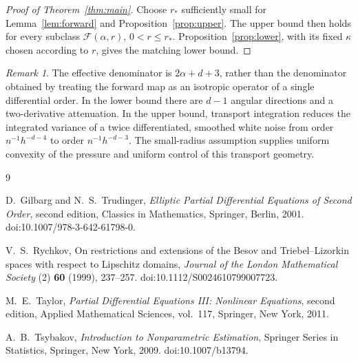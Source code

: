 \documentclass[11pt]{article}
\theoremstyle{remark}
\newtheorem{remark}[theorem]{Remark}
\newcommand{\cF}{\mathcal F}
\begin{document}
\begin{proof}[Proof of Theorem~\ref{thm:main}]
Choose \(r_*\) sufficiently small for
Lemma~\ref{lem:forward} and Proposition~\ref{prop:upper}.
The upper bound then holds for every subclass
\(\cF(\alpha,r)\), \(0<r\leq r_*\).
Proposition~\ref{prop:lower}, with its fixed \(\kappa\) chosen
according to \(r\), gives the matching lower bound.
\end{proof}

\begin{remark}
The effective denominator is \(2\alpha+d+3\), rather than the
denominator obtained by treating the forward map as an isotropic
operator of a single differential order. In the lower bound there
are \(d-1\) angular directions and a two-derivative attenuation.
In the upper bound, transport integration reduces the integrated
variance of a twice differentiated, smoothed white noise from
order \(n^{-1}h^{-d-4}\) to order \(n^{-1}h^{-d-3}\).
The small-radius assumption supplies uniform convexity of the
pressure and uniform control of this transport geometry.
\end{remark}

\begin{thebibliography}{9}

D.~Gilbarg and N.~S.~Trudinger,
\emph{Elliptic Partial Differential Equations of Second Order},
second edition, Classics in Mathematics,
Springer, Berlin, 2001.
doi:10.1007/978-3-642-61798-0.

V.~S.~Rychkov,
On restrictions and extensions of the Besov and Triebel--Lizorkin
spaces with respect to Lipschitz domains,
\emph{Journal of the London Mathematical Society} (2)
\textbf{60} (1999), 237--257.
doi:10.1112/S0024610799007723.

M.~E.~Taylor,
\emph{Partial Differential Equations III: Nonlinear Equations},
second edition, Applied Mathematical Sciences, vol.~117,
Springer, New York, 2011.

A.~B.~Tsybakov,
\emph{Introduction to Nonparametric Estimation},
Springer Series in Statistics,
Springer, New York, 2009.
doi:10.1007/b13794.

\end{thebibliography}
\end{document}
